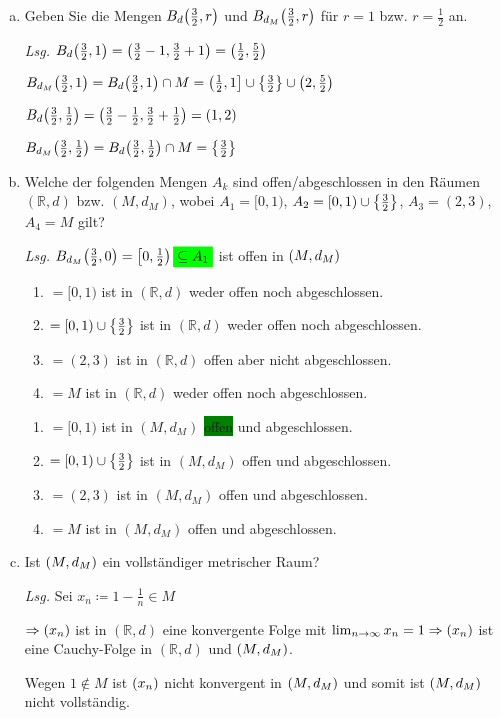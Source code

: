\documentclass{scrreprt}
\begin{document}
\begin{enumerate}[a)]
\item Geben Sie die Mengen $B_d\qty(\frac{3}{2}, r)$ und $B_{d_M}\qty(\frac{3}{2}, r)$
  für $r = 1$ bzw. $r = \frac{1}{2}$ an.

  \textit{Lsg.} $B_d\qty(\frac{3}{2}, 1) = \qty(\frac{3}{2} - 1, \frac{3}{2} + 1) = \qty(\frac{1}{2}, \frac{5}{2})$

  $B_{d_M}\qty(\frac{3}{2}, 1) = B_d\qty(\frac{3}{2}, 1) \cap M = \left(\frac{1}{2}, 1\right] \cup \qty{\frac{3}{2}} \cup \qty(2, \frac{5}{2})$

  $B_d\qty(\frac{3}{2}, \frac{1}{2}) = \qty(\frac{3}{2} - \frac{1}{2}, \frac{3}{2} + \frac{1}{2}) = \qty(1, 2)$

  $B_{d_M}\qty(\frac{3}{2}, \frac{1}{2}) = B_d\qty(\frac{3}{2}, \frac{1}{2}) \cap M = \qty{\frac{3}{2}}$

\item Welche der folgenden Mengen $A_k$ sind offen/abgeschlossen in den Räumen $(\mathbb{R}, d)$
  bzw. $(M, d_M)$, wobei $A_1 = [0, 1)$, $A_2 = [0, 1) \cup \qty{\frac{3}{2}}$, $A_3 = (2, 3)$,
  $A_4 = M$ gilt?

  \textit{Lsg.}
  $B_{d_M}\qty(\frac{3}{2}, 0) = \left[0, \frac{1}{2}\right) \colorbox{green}{$\subseteq A_1$}$ ist offen in $\qty(M, d_M)$

  \begin{enumerate}[label={$A_{\arabic*}$}]
  \item $= [0, 1)$ ist in $(\mathbb{R}, d)$ weder offen noch abgeschlossen.
  \item $= [0, 1) \cup \qty{\frac{3}{2}}$ ist in $(\mathbb{R}, d)$ weder offen noch abgeschlossen.
  \item $= (2, 3)$ ist in $(\mathbb{R}, d)$ offen aber nicht abgeschlossen.
  \item $= M$ ist in $(\mathbb{R}, d)$ weder offen noch abgeschlossen.
  \end{enumerate}
  \begin{enumerate}[label={$A_{\arabic*}$}]
  \item $= [0, 1)$ ist in $(M, d_M)$ \colorbox{green}{offen} und abgeschlossen.
  \item $= [0, 1) \cup \qty{\frac{3}{2}}$ ist in $(M, d_M)$ offen und abgeschlossen.
  \item $= (2, 3)$ ist in $(M, d_M)$ offen und abgeschlossen.
  \item $= M$ ist in $(M, d_M)$ offen und abgeschlossen.
  \end{enumerate}

\item Ist $\qty(M, d_M)$ ein vollständiger metrischer Raum?

  \textit{Lsg.} Sei $x_n \coloneqq 1 - \frac{1}{n} \in M$

  $\Rightarrow \qty(x_n)$ ist in $(\mathbb{R}, d)$ eine konvergente Folge mit
  $\lim_{n \to \infty} x_n = 1 \Rightarrow \qty(x_n)$ ist eine Cauchy-Folge in
  $(\mathbb{R}, d)$ und $\qty(M, d_M)$.

  Wegen $1 \notin M$ ist $\qty(x_n)$ nicht konvergent in $\qty(M, d_M)$
  und somit ist $\qty(M, d_M)$ nicht vollständig.
\end{enumerate}
\end{document}
